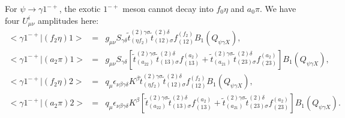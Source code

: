 For $\psi\to\gamma 1^{-+}$, the exotic $1^{-+}$ meson cannot decay
into $f_0\eta$ and $a_0\pi$. We have four $U^i_{\mu\nu}$
amplitudes here:
\begin{eqnarray}
<\gamma 1^{-+}|(f_2\eta)1> \!&=&\! g_{\mu\nu} S_{\gamma\delta}
\tilde t^{(2)\gamma\sigma}_{(\eta f_2)} \tilde
t^{(2)\delta}_{(12)\sigma}
f_{(12)}^{(f_2)}B_1(Q_{\psi\gamma X}), \\
<\gamma 1^{-+}|(a_2\pi)1> \!&=&\! g_{\mu\nu} S_{\gamma\delta}
[\tilde t^{(2)\gamma\sigma}_{(a_22)}\tilde
t_{(13)\sigma}^{(2)\delta} f_{(13)}^{(a_2)} + \tilde
t^{(2)\gamma\sigma}_{(a_21)}\tilde
t_{(23)\sigma}^{(2)\delta}f_{(23)}^{(a_2)}]B_1(Q_{\psi\gamma X}), \\
<\gamma 1^{-+}|(f_2\eta)2> \!&=&\! q_\mu
\epsilon_{\nu\beta\gamma\delta}K^\beta \tilde
t^{(2)\gamma\sigma}_{(\eta f_2)} \tilde t^{(2)\delta}_{(12)\sigma}
f_{(12)}^{(f_2)}B_1(Q_{\psi\gamma X}), \\
<\gamma 1^{-+}|(a_2\pi)2> \!&=&\! q_\mu
\epsilon_{\nu\beta\gamma\delta}K^\beta [\tilde
t^{(2)\gamma\sigma}_{(a_22)}\tilde t_{(13)\sigma}^{(2)\delta}
f_{(13)}^{(a_2)} + \tilde t^{(2)\gamma\sigma}_{(a_21)}\tilde
t_{(23)\sigma}^{(2)\delta}f_{(23)}^{(a_2)}]B_1(Q_{\psi\gamma X}).
\end{eqnarray}

